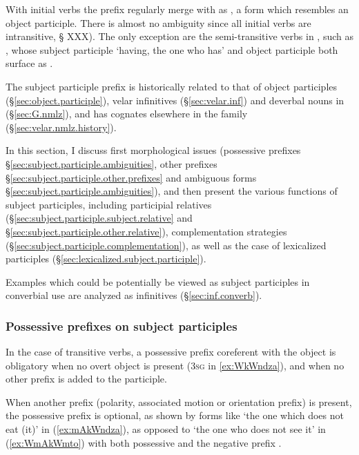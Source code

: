 With  initial verbs the  prefix regularly merge with  as , a form which resembles an object participle. There is almost no ambiguity since all  initial verbs are intransitive, § XXX). The only exception are the semi-transitive verbs in , such as , whose subject participle  `having, the one who has' and object participle  both surface as .

The subject participle  prefix is historically related to that of object participles (§\ref{sec:object.participle}), velar infinitives (§\ref{sec:velar.inf}) and deverbal nouns in  (§\ref{sec:G.nmlz}), and has cognates elsewhere in the family (§\ref{sec:velar.nmlz.history}).

In this section, I discuss first morphological issues (possessive prefixes §\ref{sec:subject.participle.ambiguities}, other prefixes §\ref{sec:subject.participle.other.prefixes} and ambiguous forms §\ref{sec:subject.participle.ambiguities}), and then present the various functions of subject participles, including participial relatives (§\ref{sec:subject.participle.subject.relative} and §\ref{sec:subject.participle.other.relative}), complementation strategies (§\ref{sec:subject.participle.complementation}), as well as the case of lexicalized participles (§\ref{sec:lexicalized.subject.participle}).
 
Examples which could be potentially be viewed as subject participles in converbial use are analyzed as  infinitives (§\ref{sec:inf.converb}).

\subsubsection{Possessive prefixes on subject participles}  \label{sec:subject.participle.possessive}

In the case of transitive verbs, a possessive prefix coreferent with the object is obligatory when no overt object is present (\textsc{3sg}  in \ref{ex:WkWndza}), and when no other prefix is added to the participle.

When another prefix (polarity, associated motion or orientation prefix) is present, the possessive prefix is optional, as shown by forms like  `the one which does not eat (it)' in (\ref{ex:mAkWndza}), as opposed to  `the one who does not see it' in (\ref{ex:WmAkWmto}) with both possessive  and the negative prefix .

